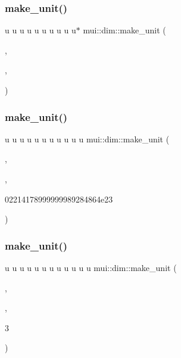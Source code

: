 \mbox{\label{namespacemui_1_1dim_ad13049779c3b8b8d6b0835c1c71e6c72}} 
\subsubsection{\texorpdfstring{make\+\_\+unit()}{make\_unit()}\hspace{0.1cm}{\footnotesize\ttfamily [11/32]}}
{\footnotesize\ttfamily u u u u u u u u u u$\ast$ mui\+::dim\+::make\+\_\+unit (\begin{DoxyParamCaption}\item[{\hyperlink{namespacemui_1_1dim_a3d9b1e07165d3ef9a3d9213035e05d8e}{temperature}}]{,  }\item[{K}]{,  }\item[{u}]{ }\end{DoxyParamCaption})}

\mbox{\label{namespacemui_1_1dim_a9c5b0b92a5e28354122e6c161e4cff81}} 
\subsubsection{\texorpdfstring{make\+\_\+unit()}{make\_unit()}\hspace{0.1cm}{\footnotesize\ttfamily [12/32]}}
{\footnotesize\ttfamily u u u u u u u u u u u mui\+::dim\+::make\+\_\+unit (\begin{DoxyParamCaption}\item[{\hyperlink{namespacemui_1_1dim_a00ff3f13d3bd0f4564227904373dc3eb}{amount}}]{,  }\item[{mol}]{,  }\item[{u $\ast$6.}]{02214178999999989284864e23 }\end{DoxyParamCaption})}

\mbox{\label{namespacemui_1_1dim_af35c9a8a4960413b0b407ce98ff3c20b}} 
\subsubsection{\texorpdfstring{make\+\_\+unit()}{make\_unit()}\hspace{0.1cm}{\footnotesize\ttfamily [13/32]}}
{\footnotesize\ttfamily u u u u u u u u u u u u mui\+::dim\+::make\+\_\+unit (\begin{DoxyParamCaption}\item[{\hyperlink{namespacemui_1_1dim_ac15a72100f3e57d6c9419fca5501b456}{current}}]{,  }\item[{m\+Amp}]{,  }\item[{u $\ast$1e-\/}]{3 }\end{DoxyParamCaption})}

